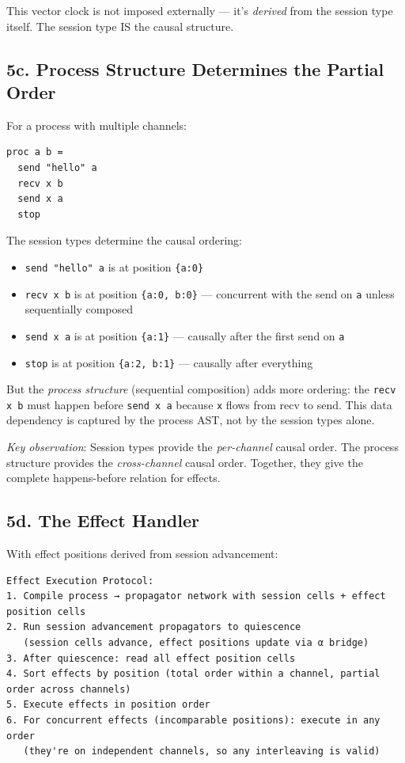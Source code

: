 \documentclass[11pt]{article}
\begin{document}
This vector clock is not imposed externally — it's \emph{derived} from the session
type itself. The session type IS the causal structure.
\subsection{5c. Process Structure Determines the Partial Order}
\label{sec:org43c89c3}

For a process with multiple channels:

\begin{verbatim}
proc a b =
  send "hello" a
  recv x b
  send x a
  stop
\end{verbatim}

The session types determine the causal ordering:
\begin{itemize}
\item \texttt{send "hello" a} is at position \texttt{\{a:0\}}
\item \texttt{recv x b} is at position \texttt{\{a:0, b:0\}} — concurrent with the send on \texttt{a}
unless sequentially composed
\item \texttt{send x a} is at position \texttt{\{a:1\}} — causally after the first send on \texttt{a}
\item \texttt{stop} is at position \texttt{\{a:2, b:1\}} — causally after everything
\end{itemize}

But the \emph{process structure} (sequential composition) adds more ordering:
the \texttt{recv x b} must happen before \texttt{send x a} because \texttt{x} flows from recv
to send. This data dependency is captured by the process AST, not by the
session types alone.

\emph{Key observation}: Session types provide the \emph{per-channel} causal order.
The process structure provides the \emph{cross-channel} causal order. Together,
they give the complete happens-before relation for effects.
\subsection{5d. The Effect Handler}
\label{sec:orgc82088d}

With effect positions derived from session advancement:

\begin{verbatim}
Effect Execution Protocol:
1. Compile process → propagator network with session cells + effect position cells
2. Run session advancement propagators to quiescence
   (session cells advance, effect positions update via α bridge)
3. After quiescence: read all effect position cells
4. Sort effects by position (total order within a channel, partial order across channels)
5. Execute effects in position order
6. For concurrent effects (incomparable positions): execute in any order
   (they're on independent channels, so any interleaving is valid)
\end{verbatim}
\end{document}
